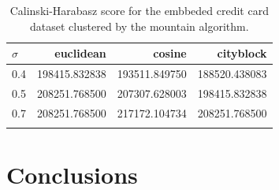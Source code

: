 \documentclass[conference]{IEEEtran}
\begin{document}
\begin{table}[ht!]
    \centering
    \begin{tabular}{lrrr}
        \toprule
        $\sigma$ &      euclidean &         cosine &      cityblock \\
        \midrule
        0.4 &  198415.832838 &  193511.849750 &  188520.438083 \\
        0.5 &  208251.768500 &  207307.628003 &  198415.832838 \\
        0.7 &  208251.768500 &  217172.104734 &  208251.768500 \\
        \bottomrule \\
        \end{tabular}
    \caption{Calinski-Harabasz score for the embbeded credit card dataset clustered by the mountain algorithm.}
    \label{tab:ce_ch_m}
\end{table}

\section{Conclusions}

\nocite{*}


\end{document}
